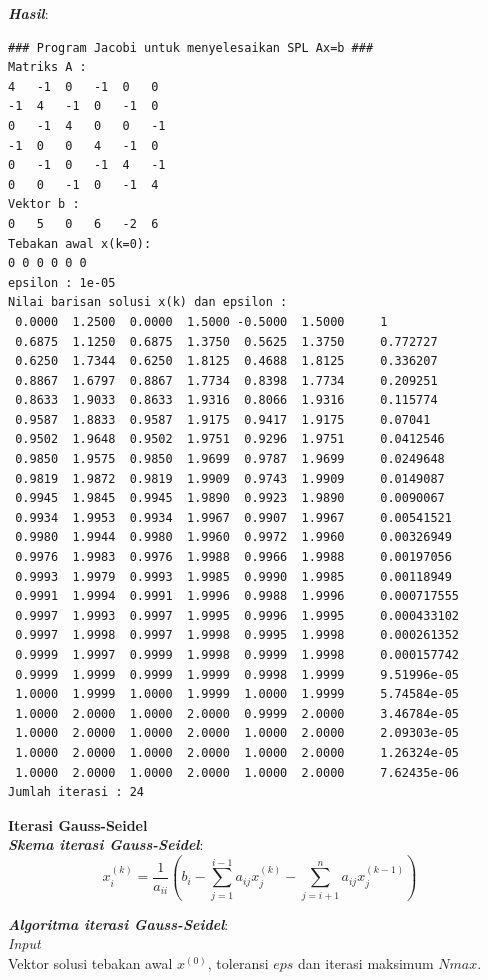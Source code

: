 \documentclass[paper=a4, fontsize=11pt]{scrartcl}
\numberwithin{equation}{section} %
\numberwithin{figure}{section} %
\numberwithin{table}{section} %
\begin{document}
\textit{\textbf{Hasil}}:
\begin{small}
\begin{verbatim}
### Program Jacobi untuk menyelesaikan SPL Ax=b ###
Matriks A : 
4	-1	0	-1	0	0	
-1	4	-1	0	-1	0	
0	-1	4	0	0	-1	
-1	0	0	4	-1	0	
0	-1	0	-1	4	-1	
0	0	-1	0	-1	4	
Vektor b : 
0	5	0	6	-2	6	
Tebakan awal x(k=0): 
0 0 0 0 0 0 
epsilon : 1e-05
Nilai barisan solusi x(k) dan epsilon : 
 0.0000  1.2500  0.0000  1.5000 -0.5000  1.5000 	1
 0.6875  1.1250  0.6875  1.3750  0.5625  1.3750 	0.772727
 0.6250  1.7344  0.6250  1.8125  0.4688  1.8125 	0.336207
 0.8867  1.6797  0.8867  1.7734  0.8398  1.7734 	0.209251
 0.8633  1.9033  0.8633  1.9316  0.8066  1.9316 	0.115774
 0.9587  1.8833  0.9587  1.9175  0.9417  1.9175 	0.07041
 0.9502  1.9648  0.9502  1.9751  0.9296  1.9751 	0.0412546
 0.9850  1.9575  0.9850  1.9699  0.9787  1.9699 	0.0249648
 0.9819  1.9872  0.9819  1.9909  0.9743  1.9909 	0.0149087
 0.9945  1.9845  0.9945  1.9890  0.9923  1.9890 	0.0090067
 0.9934  1.9953  0.9934  1.9967  0.9907  1.9967 	0.00541521
 0.9980  1.9944  0.9980  1.9960  0.9972  1.9960 	0.00326949
 0.9976  1.9983  0.9976  1.9988  0.9966  1.9988 	0.00197056
 0.9993  1.9979  0.9993  1.9985  0.9990  1.9985 	0.00118949
 0.9991  1.9994  0.9991  1.9996  0.9988  1.9996 	0.000717555
 0.9997  1.9993  0.9997  1.9995  0.9996  1.9995 	0.000433102
 0.9997  1.9998  0.9997  1.9998  0.9995  1.9998 	0.000261352
 0.9999  1.9997  0.9999  1.9998  0.9999  1.9998 	0.000157742
 0.9999  1.9999  0.9999  1.9999  0.9998  1.9999 	9.51996e-05
 1.0000  1.9999  1.0000  1.9999  1.0000  1.9999 	5.74584e-05
 1.0000  2.0000  1.0000  2.0000  0.9999  2.0000 	3.46784e-05
 1.0000  2.0000  1.0000  2.0000  1.0000  2.0000 	2.09303e-05
 1.0000  2.0000  1.0000  2.0000  1.0000  2.0000 	1.26324e-05
 1.0000  2.0000  1.0000  2.0000  1.0000  2.0000 	7.62435e-06
Jumlah iterasi : 24
\end{verbatim}
\end{small}

\vspace{1cm}
\textbf{\large Iterasi Gauss-Seidel}\\
\textit{\textbf{Skema iterasi Gauss-Seidel}}:\\
\begin{equation}
x_{i}^{(k)} = \frac{1}{a_{ii}}\left(b_{i} -\sum_{j=1}^{i-1}a_{ij}x_{j}^{(k)} -\sum_{j=i+1}^{n}a_{ij}x_{j}^{(k-1)}\right)
\end{equation}

\textit{\textbf{Algoritma iterasi Gauss-Seidel}}:\\
\textit{Input}\\
Vektor solusi tebakan awal $x^{(0)}$, toleransi $eps$ dan iterasi maksimum $Nmax$.\\
\end{document}
